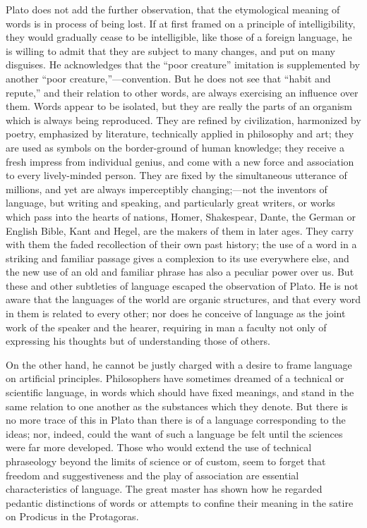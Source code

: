 \documentclass[11pt,letter]{article}
\begin{document}
\par  Plato does not add the further observation, that the etymological meaning of words is in process of being lost. If at first framed on a principle of intelligibility, they would gradually cease to be intelligible, like those of a foreign language, he is willing to admit that they are subject to many changes, and put on many disguises. He acknowledges that the “poor creature” imitation is supplemented by another “poor creature,”—convention. But he does not see that “habit and repute,” and their relation to other words, are always exercising an influence over them. Words appear to be isolated, but they are really the parts of an organism which is always being reproduced. They are refined by civilization, harmonized by poetry, emphasized by literature, technically applied in philosophy and art; they are used as symbols on the border-ground of human knowledge; they receive a fresh impress from individual genius, and come with a new force and association to every lively-minded person. They are fixed by the simultaneous utterance of millions, and yet are always imperceptibly changing;—not the inventors of language, but writing and speaking, and particularly great writers, or works which pass into the hearts of nations, Homer, Shakespear, Dante, the German or English Bible, Kant and Hegel, are the makers of them in later ages. They carry with them the faded recollection of their own past history; the use of a word in a striking and familiar passage gives a complexion to its use everywhere else, and the new use of an old and familiar phrase has also a peculiar power over us. But these and other subtleties of language escaped the observation of Plato. He is not aware that the languages of the world are organic structures, and that every word in them is related to every other; nor does he conceive of language as the joint work of the speaker and the hearer, requiring in man a faculty not only of expressing his thoughts but of understanding those of others.

\par  On the other hand, he cannot be justly charged with a desire to frame language on artificial principles. Philosophers have sometimes dreamed of a technical or scientific language, in words which should have fixed meanings, and stand in the same relation to one another as the substances which they denote. But there is no more trace of this in Plato than there is of a language corresponding to the ideas; nor, indeed, could the want of such a language be felt until the sciences were far more developed. Those who would extend the use of technical phraseology beyond the limits of science or of custom, seem to forget that freedom and suggestiveness and the play of association are essential characteristics of language. The great master has shown how he regarded pedantic distinctions of words or attempts to confine their meaning in the satire on Prodicus in the Protagoras.
\end{document}
